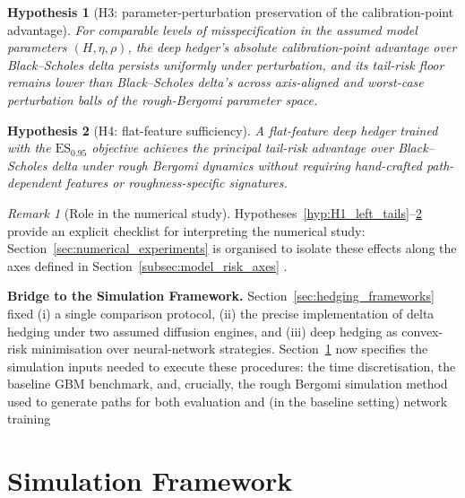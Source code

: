 \documentclass[12pt,a4paper]{article}
\theoremstyle{definition}
\theoremstyle{plain}
\newtheorem{hypothesis}{Hypothesis}
\theoremstyle{remark}
\newtheorem{remark}{Remark}[section]
\theoremstyle{plain}
\begin{document}
\begin{hypothesis}[H3: parameter-perturbation preservation of the calibration-point advantage]\label{hyp:H3_param_robustness}
For comparable levels of misspecification in the assumed model parameters $(H, \eta, \rho)$, the deep hedger's absolute calibration-point advantage over Black--Scholes delta persists uniformly under perturbation, and its tail-risk floor remains lower than Black--Scholes delta's across axis-aligned and worst-case perturbation balls of the rough-Bergomi parameter space.
\end{hypothesis}

\begin{hypothesis}[H4: flat-feature sufficiency]\label{hyp:H4_state_compression}
A flat-feature deep hedger trained with the $\mathrm{ES}_{0.95}$ objective achieves the principal tail-risk advantage over Black--Scholes delta under rough Bergomi dynamics without requiring hand-crafted path-dependent features or roughness-specific signatures.
\end{hypothesis}

\begin{remark}[Role in the numerical study]
\label{rem:hypotheses_role}
Hypotheses~\ref{hyp:H1_left_tails}--\ref{hyp:H4_state_compression} provide an explicit checklist for interpreting the numerical study:
Section~\ref{sec:numerical_experiments} is organised to isolate these effects along the axes defined in Section~\ref{subsec:model_risk_axes} \cite{ElKaroui1998Robustness,Horvath2021DeepRough}.
\end{remark}

\medskip

\noindent
\textbf{Bridge to the Simulation Framework.}
Section~\ref{sec:hedging_frameworks} fixed (i) a single comparison protocol, (ii) the precise implementation of delta hedging
under two assumed diffusion engines, and (iii) deep hedging as convex-risk minimisation over neural-network strategies.
Section~\ref{sec:simulation_framework} now specifies the simulation inputs needed to execute these procedures:
the time discretisation, the baseline GBM benchmark, and, crucially, the rough Bergomi simulation method used to generate paths for both
evaluation and (in the baseline setting) network training \cite{BayerFriz2016,Horvath2021DeepRough}


\newpage

\section{Simulation Framework}
\label{sec:simulation_framework}
\end{document}

